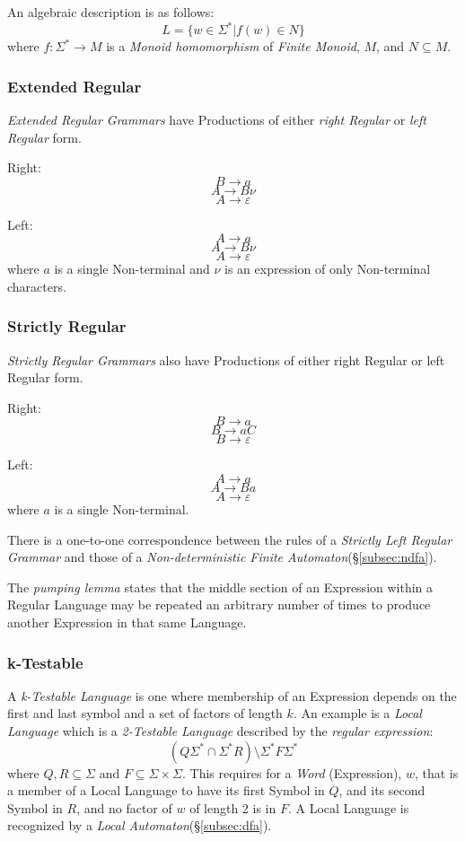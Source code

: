 \documentclass{article}
\begin{document}
An algebraic description is as follows:
\[
    L = \{ w \in \Sigma^* | f(w) \in N \}
\]
where $f : \Sigma^* \rightarrow M$ is a \emph{Monoid homomorphism} of
\emph{Finite Monoid}, $M$, and $N \subseteq M$.

\subsubsection{Extended Regular}
\emph{Extended Regular Grammars} have Productions of either \emph{right
Regular} or \emph{left Regular} form.

Right:
\[
    B \rightarrow a
\]\[
    A \rightarrow B \nu
\]\[
    A \rightarrow \varepsilon
\]

Left:
\[
    A \rightarrow a
\]\[
    A \rightarrow B \nu
\]\[
    A \rightarrow \varepsilon
\]
where $a$ is a single Non-terminal and $\nu$ is an expression of only
Non-terminal characters.

\subsubsection{Strictly Regular}
\emph{Strictly Regular Grammars} also have Productions of either right
Regular or left Regular form.

Right:
\[
    B \rightarrow a
\]\[
    B \rightarrow aC
\]\[
    B \rightarrow \varepsilon
\]

Left:
\[
    A \rightarrow a
\]\[
    A \rightarrow Ba
\]\[
    A \rightarrow \varepsilon
\]
where $a$ is a single Non-terminal.

There is a one-to-one correspondence between the rules of a
\emph{Strictly Left Regular Grammar} and those of a
\emph{Non-deterministic Finite Automaton}(\S\ref{subsec:ndfa}).

The \emph{pumping lemma} states that the middle section of an
Expression within a Regular Language may be repeated an arbitrary
number of times to produce another Expression in that same Language.

\subsubsection{k-Testable}\label{subsec:k_testable}
A \emph{k-Testable Language} is one where membership of an Expression
depends on the first and last symbol and a set of factors of length
$k$. An example is a \emph{Local Language} which is a \emph{2-Testable
  Language} described by the \emph{regular expression}:
\[
    (Q\Sigma^* \cap \Sigma^*R)\setminus\Sigma^*F\Sigma^*
\]
where $Q,R \subseteq \Sigma$ and $F \subseteq \Sigma \times
\Sigma$. This requires for a \emph{Word} (Expression), $w$, that is a
member of a Local Language to have its first Symbol in $Q$, and its
second Symbol in $R$, and no factor of $w$ of length 2 is in $F$. A
Local Language is recognized by a \emph{Local
  Automaton}(\S\ref{subsec:dfa}).
\end{document}
